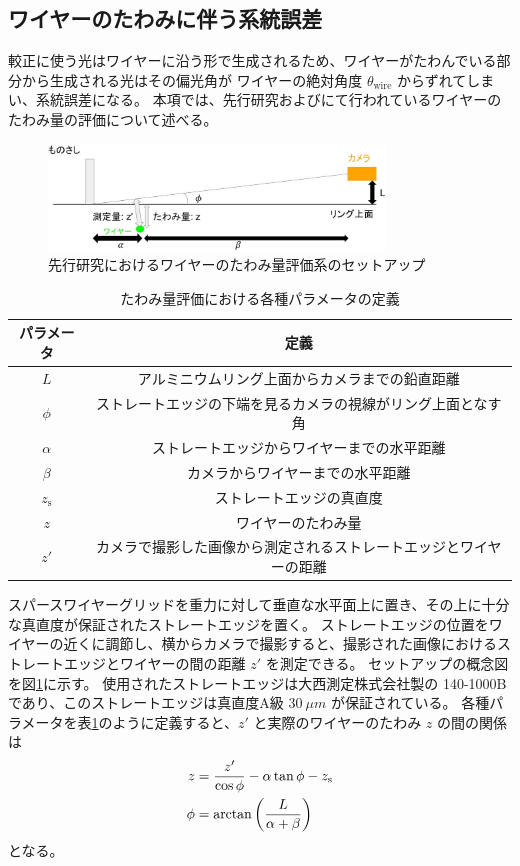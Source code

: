 \documentclass[../../main.tex]{subfiles}
\begin{document}
\subsection{ワイヤーのたわみに伴う系統誤差}
較正に使う光はワイヤーに沿う形で生成されるため、ワイヤーがたわんでいる部分から生成される光はその偏光角が
ワイヤーの絶対角度 $\theta_{\mathrm{wire}}$ からずれてしまい、系統誤差になる。
本項では、先行研究\cite{swg:murata}および\cite{swg:iijima}にて行われているワイヤーのたわみ量の評価について述べる。
\begin{figure}[H]
    \centering
    \includegraphics[width=0.8\textwidth]{wiregrid/wiresag_setup_old.pdf}
    \caption{先行研究におけるワイヤーのたわみ量評価系のセットアップ\cite{swg:murata}}
    \label{fig:wiresag_setup_old}
\end{figure}
\begin{table}[H]
    \centering
    \caption{たわみ量評価における各種パラメータの定義}
    \begin{tabular}{|c|c|}
        \hline
        パラメータ & 定義 \\
        \hline
        $L$ & アルミニウムリング上面からカメラまでの鉛直距離 \\
        $\phi$ & ストレートエッジの下端を見るカメラの視線がリング上面となす角 \\
        $\alpha$ & ストレートエッジからワイヤーまでの水平距離 \\
        $\beta$ & カメラからワイヤーまでの水平距離 \\
        $z_{\mathrm{s}}$ & ストレートエッジの真直度 \\
        $z$ & ワイヤーのたわみ量 \\
        $z'$ & カメラで撮影した画像から測定されるストレートエッジとワイヤーの距離 \\
        \hline
    \end{tabular}
    \label{tab:wiresag_setup_old}
\end{table}
スパースワイヤーグリッドを重力に対して垂直な水平面上に置き、その上に十分な真直度が保証されたストレートエッジを置く。
ストレートエッジの位置をワイヤーの近くに調節し、横からカメラで撮影すると、撮影された画像におけるストレートエッジとワイヤーの間の距離 $z'$ を測定できる。
セットアップの概念図を図\ref{fig:wiresag_setup_old}に示す。
使用されたストレートエッジは大西測定株式会社製の 140-1000B であり、このストレートエッジは真直度A級 $\SI{30}{\mu m}$ が保証されている。
各種パラメータを表\ref{tab:wiresag_setup_old}のように定義すると、$z'$ と実際のワイヤーのたわみ $z$ の間の関係は
\begin{align}
    z &= \dfrac{z'}{\cos\phi} - \alpha\tan\phi - z_{\mathrm{s}} \\
    \phi &= \arctan\qty(\dfrac{L}{\alpha+\beta})
\end{align}
となる。
\end{document}
